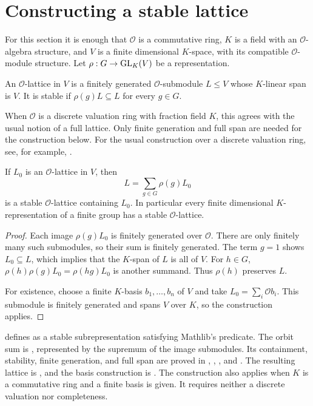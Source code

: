 \section{Constructing a stable lattice}
\label{lib:reduction:stable-lattice}

\begin{samepage}
For this section it is enough that $\mathcal O$ is a commutative ring,
$K$ is a field with an $\mathcal O$-algebra structure, and $V$ is a finite
dimensional $K$-space, with its compatible $\mathcal O$-module structure.
Let $\rho:G\to\operatorname{GL}_K(V)$ be a representation.

\end{samepage}

\begin{definition}
An $\mathcal O$-lattice in $V$ is a finitely generated
$\mathcal O$-submodule $L\leq V$ whose $K$-linear span is $V$.
It is stable if $\rho(g)L\subseteq L$ for every $g\in G$.
\end{definition}

When $\mathcal O$ is a discrete valuation ring with fraction field $K$,
this agrees with the usual notion of a full lattice. Only finite
generation and full span are needed for the construction below. For the
usual construction over a discrete valuation ring, see, for example,
\cite[\S15.2]{Serre1977}.

\begin{proposition}
\label{lib:reduction:existence}
If $L_0$ is an $\mathcal O$-lattice in $V$, then
\[
 L=\sum_{g\in G}\rho(g)L_0
\]
is a stable $\mathcal O$-lattice containing $L_0$. In particular every
finite dimensional $K$-representation of a finite group has a stable
$\mathcal O$-lattice.
\end{proposition}
\begin{proof}
Each image $\rho(g)L_0$ is finitely generated over $\mathcal O$.
There are only finitely many such submodules, so their sum is finitely
generated. The term $g=1$ shows $L_0\subseteq L$, which implies that the
$K$-span of $L$ is all of $V$. For $h\in G$,
$\rho(h)\rho(g)L_0=\rho(hg)L_0$ is another summand. Thus $\rho(h)$
preserves $L$.

For existence, choose a finite $K$-basis $b_1,\ldots,b_n$ of $V$ and
take $L_0=\sum_i\mathcal O b_i$. This submodule is finitely generated
and spans $V$ over $K$, so the construction applies.
\end{proof}

\begin{implementation}
 defines  as a stable
subrepresentation satisfying Mathlib's  predicate. The orbit sum is
, represented by the supremum of the image
submodules. Its containment, stability, finite generation, and full span
are proved in , ,
, and . The resulting lattice
is , and the basis construction is .
The construction  also applies when $K$ is a commutative
ring and a finite basis is given. It requires neither a discrete valuation
nor completeness.
\end{implementation}

